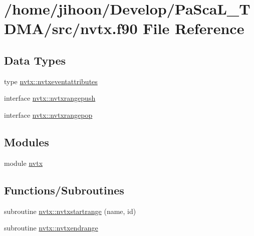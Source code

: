\hypertarget{nvtx_8f90}{}\section{/home/jihoon/\+Develop/\+Pa\+Sca\+L\+\_\+\+T\+D\+M\+A/src/nvtx.f90 File Reference}
\label{nvtx_8f90}
\subsection*{Data Types}
\begin{DoxyCompactItemize}
\item 
type \hyperlink{structnvtx_1_1nvtxeventattributes}{nvtx\+::nvtxeventattributes}
\item 
interface \hyperlink{interfacenvtx_1_1nvtxrangepush}{nvtx\+::nvtxrangepush}
\item 
interface \hyperlink{interfacenvtx_1_1nvtxrangepop}{nvtx\+::nvtxrangepop}
\end{DoxyCompactItemize}
\subsection*{Modules}
\begin{DoxyCompactItemize}
\item 
module \hyperlink{namespacenvtx}{nvtx}
\end{DoxyCompactItemize}
\subsection*{Functions/\+Subroutines}
\begin{DoxyCompactItemize}
\item 
subroutine \hyperlink{namespacenvtx_abaf43be3229e42bd0f4c1e75d9670075}{nvtx\+::nvtxstartrange} (name, id)
\item 
subroutine \hyperlink{namespacenvtx_aed9b06c5398e0a5b8d7a6e687564fb46}{nvtx\+::nvtxendrange}
\end{DoxyCompactItemize}
